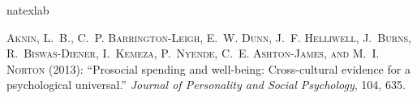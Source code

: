 \documentclass[10pt, letterpaper]{article}
\begin{document}
\begin{spacing}{1.4}







%

\begin{spacing}{.9}

\begin{thebibliography}{71}
\newcommand{\enquote}[1]{``#1''}
\expandafter\ifx\csname natexlab\endcsname\relax\def\natexlab#1{#1}\fi

\textsc{Aknin, L.~B., C.~P. Barrington-Leigh, E.~W. Dunn, J.~F. Helliwell,
  J.~Burns, R.~Biswas-Diener, I.~Kemeza, P.~Nyende, C.~E. Ashton-James, and
  M.~I. Norton} (2013): \enquote{Prosocial spending and well-being:
  Cross-cultural evidence for a psychological universal.} \emph{Journal of
  Personality and Social Psychology}, 104, 635.


\end{thebibliography}
\end{spacing}
\end{spacing}
\end{document}
